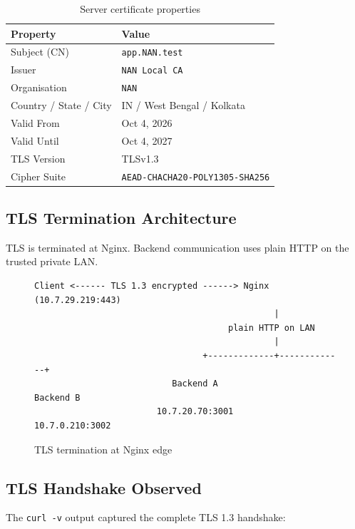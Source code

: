 \documentclass[12pt,a4paper]{article}
\begin{document}
\begin{table}[h!]
\centering
\caption{Server certificate properties}
\begin{tabular}{ll}
\toprule
\textbf{Property} & \textbf{Value} \\
\midrule
Subject (CN) & \texttt{app.NAN.test} \\
Issuer & \texttt{NAN Local CA} \\
Organisation & \texttt{NAN} \\
Country / State / City & IN / West Bengal / Kolkata \\
Valid From & Oct 4, 2026 \\
Valid Until & Oct 4, 2027 \\
TLS Version & TLSv1.3 \\
Cipher Suite & \texttt{AEAD-CHACHA20-POLY1305-SHA256} \\
\bottomrule
\end{tabular}
\end{table}

\subsection{TLS Termination Architecture}

TLS is terminated at Nginx. Backend communication uses plain HTTP on the trusted private LAN.

\begin{figure}[h!]
\centering
\begin{mdframed}[backgroundcolor=codebg,linecolor=borderblue]
\begin{verbatim}
Client <------ TLS 1.3 encrypted ------> Nginx (10.7.29.219:443)
                                               |
                                      plain HTTP on LAN
                                               |
                                 +-------------+-------------+
                           Backend A                   Backend B
                        10.7.20.70:3001             10.7.0.210:3002
\end{verbatim}
\end{mdframed}
\caption{TLS termination at Nginx edge}
\end{figure}

\subsection{TLS Handshake Observed}

The \texttt{curl -v} output captured the complete TLS 1.3 handshake:
\end{document}
